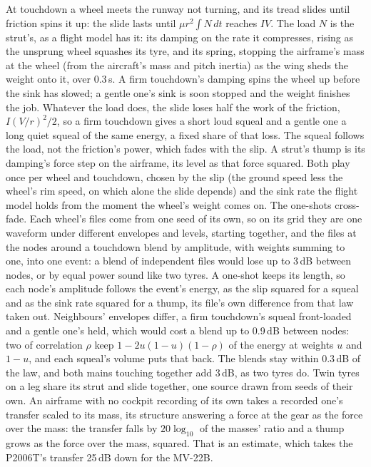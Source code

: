 \documentclass[10pt,a4paper,twocolumn]{article}
\begin{document}
At touchdown a wheel meets the runway not turning, and its tread slides until friction spins it up: the slide lasts until $\mu r^2\int N\,dt$ reaches $IV$. The load $N$ is the strut's, as a flight model has it: its damping on the rate it compresses, rising as the unsprung wheel squashes its tyre, and its spring, stopping the airframe's mass at the wheel (from the aircraft's mass and pitch inertia) as the wing sheds the weight onto it, over 0.3\,s. A firm touchdown's damping spins the wheel up before the sink has slowed; a gentle one's sink is soon stopped and the weight finishes the job. Whatever the load does, the slide loses half the work of the friction, $I(V/r)^2/2$, so a firm touchdown gives a short loud squeal and a gentle one a long quiet squeal of the same energy, a fixed share of that loss. The squeal follows the load, not the friction's power, which fades with the slip. A strut's thump is its damping's force step on the airframe, its level as that force squared. Both play once per wheel and touchdown, chosen by the slip (the ground speed less the wheel's rim speed, on which alone the slide depends) and the sink rate the flight model holds from the moment the wheel's weight comes on. The one-shots cross-fade. Each wheel's files come from one seed of its own, so on its grid they are one waveform under different envelopes and levels, starting together, and the files at the nodes around a touchdown blend by amplitude, with weights summing to one, into one event: a blend of independent files would lose up to 3\,dB between nodes, or by equal power sound like two tyres. A one-shot keeps its length, so each node's amplitude follows the event's energy, as the slip squared for a squeal and as the sink rate squared for a thump, its file's own difference from that law taken out. Neighbours' envelopes differ, a firm touchdown's squeal front-loaded and a gentle one's held, which would cost a blend up to 0.9\,dB between nodes: two of correlation $\rho$ keep $1-2u(1-u)(1-\rho)$ of the energy at weights $u$ and $1-u$, and each squeal's volume puts that back. The blends stay within 0.3\,dB of the law, and both mains touching together add 3\,dB, as two tyres do. Twin tyres on a leg share its strut and slide together, one source drawn from seeds of their own. An airframe with no cockpit recording of its own takes a recorded one's transfer scaled to its mass, its structure answering a force at the gear as the force over the mass: the transfer falls by $20\log_{10}$ of the masses' ratio and a thump grows as the force over the mass, squared. That is an estimate, which takes the P2006T's transfer 25\,dB down for the MV-22B.
\end{document}
